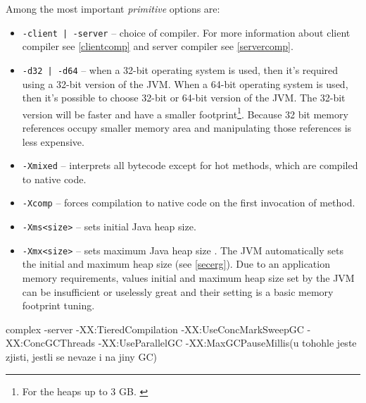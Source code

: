\documentclass[
  digital, %
  oneside,
  notable, %
  nolof,     %
  nolot     %
]{fithesis3}
\begin{document}
Among the most important \textit{primitive} options are:
\begin{itemize}
	\item \texttt{-client | -server} -- choice of compiler. For more information about client compiler see \ref{clientcomp} and server compiler see \ref{servercomp}.
	\item \texttt{-d32 | -d64} -- when a 32-bit operating system is used, then it's required using a 32-bit version of the JVM. When a 64-bit operating system is used, then it's possible to choose 32-bit or 64-bit version of the JVM. The 32-bit version will be faster and have a smaller footprint\footnote{For the heaps up to 3 GB. \cite{scott}}. Because 32 bit memory references occupy smaller memory area and manipulating those references is less expensive. \cite{scott}
	\item \texttt{-Xmixed} -- interprets all bytecode except for hot methods, which are compiled to native code. \cite{java}
	\item \texttt{-Xcomp} -- forces compilation to native code on the first invocation of method. \cite{java}
	\item \texttt{-Xms<size>} -- sets initial Java heap size. \cite{java}
	\item \texttt{-Xmx<size>} -- sets maximum Java heap size \cite{java}. The JVM automatically sets the initial and maximum heap size (see \ref{secerg}). Due to an application memory requirements, values initial and maximum heap size set by the JVM can be insufficient or uselessly great and their setting is a basic memory footprint tuning.
\end{itemize}
complex
-server	-XX:TieredCompilation
-XX:UseConcMarkSweepGC -XX:ConcGCThreads
-XX:UseParallelGC -XX:MaxGCPauseMillis(u tohohle jeste zjisti, jestli se nevaze i na jiny GC)
\end{document}
